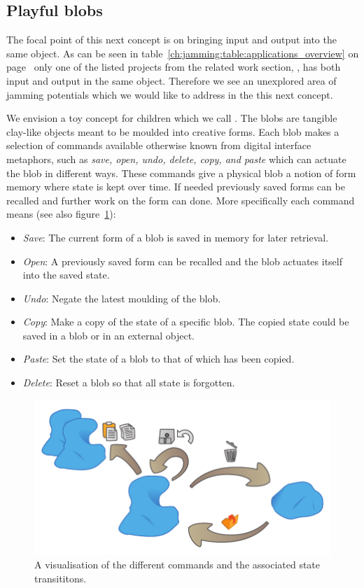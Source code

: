 \subsection{Playful blobs}
\label{ch:jamming:concepts:playful_blobs}

The focal point of this next concept is on bringing input and output into the same object.
As can be seen in table~\ref{ch:jamming:table:applications_overview} on page~\pageref{ch:jamming:table:applications_overview} only one of the listed projects from the related work section, , has both input and output in the same object.
Therefore we see an unexplored area of jamming potentials which we would like to address in the this next concept.

We envision a toy concept for children which we call .
The blobs are tangible clay-like objects meant to be moulded into creative forms.
Each blob makes a selection of commands available otherwise known from digital interface metaphors, such as \emph{save, open, undo, delete, copy, and paste} which can actuate the blob in different ways.
These commands give a physical blob a notion of form memory where state is kept over time.
If needed previously saved forms can be recalled and further work on the form can done.
More specifically each command means (see also figure~\ref{fig:ch:jamming:concepts:blobs:states}):
\begin{itemize}
	\item{\emph{Save}: The current form of a blob is saved in memory for later retrieval.}
	\item{\emph{Open}: A previously saved form can be recalled and the blob actuates itself into the saved state.}
	\item{\emph{Undo}: Negate the latest moulding of the blob.}
	\item{\emph{Copy}: Make a copy of the state of a specific blob. The copied state could be saved in a blob or in an external object.}
	\item{\emph{Paste}: Set the state of a blob to that of which has been copied.} 
	\item{\emph{Delete}: Reset a blob so that all state is forgotten.} 
\end{itemize}

\begin{figure}[h]
  \centering
  \includegraphics[width=.9\textwidth]{figures/jamming/concepts/blobs/state-transitions.pdf}
  \caption{A visualisation of the different commands and the associated state transititons.}
  \label{fig:ch:jamming:concepts:blobs:states}
\end{figure}

